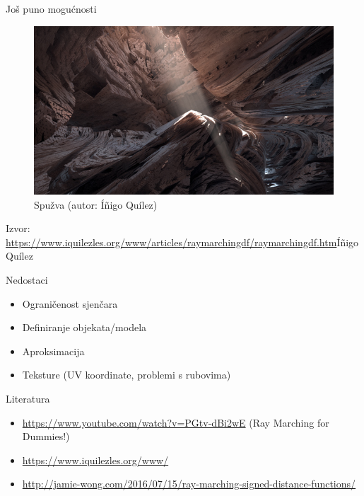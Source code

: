 \documentclass[12pt]{beamer}
\begin{document}
    \begin{frame}{Još puno mogućnosti}
    \begin{figure}
      \includegraphics[width=\textwidth,height=\textheight,keepaspectratio]{sponge.jpg}
      \caption{Spužva (autor: Íñigo Quílez)}
    \end{figure}
    Izvor: \href{https://www.iquilezles.org/www/articles/raymarchingdf/raymarchingdf.htm}{https://www.iquilezles.org/www/articles/raymarchingdf/raymarchingdf.htm}{Íñigo Quílez}
  \end{frame}

  \begin{frame}{Nedostaci}
    \begin{itemize}
    \item Ograničenost sjenčara
    \item Definiranje objekata/modela
    \item Aproksimacija
    \item Teksture (UV koordinate, problemi s rubovima)
    \end{itemize}
  \end{frame}

  \begin{frame}{Literatura}
    \begin{itemize}
    \item \href{https://www.youtube.com/watch?v=PGtv-dBi2wE}{https://www.youtube.com/watch?v=PGtv-dBi2wE} (Ray Marching for Dummies!)
    \item \href{https://www.iquilezles.org/www/}{https://www.iquilezles.org/www/}
    \item \href{http://jamie-wong.com/2016/07/15/ray-marching-signed-distance-functions/}{http://jamie-wong.com/2016/07/15/ray-marching-signed-distance-functions/}
    \end{itemize}
  \end{frame}
\end{document}
